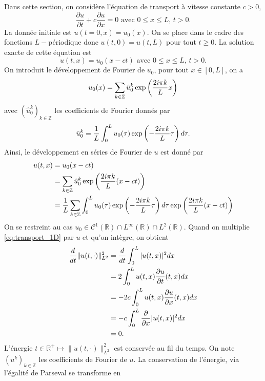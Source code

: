 Dans cette section, on considère l'équation de transport à vitesse constante $c>0$,
\begin{equation}
\dfrac{\partial u}{\partial t} + c \dfrac{\partial u}{\partial x} = 0 \text{ avec } 0 \leq x \leq L \text{, } t>0.
\label{eq:transport_1D}
\end{equation}
La donnée initiale est $u(t=0,x)=u_0(x)$. On se place dans le cadre des fonctions $L-$périodique donc $u(t,0)=u(t,L)$ pour tout $t \geq 0$. La solution exacte de cette équation est
\begin{equation}
u(t,x) = u_0(x-ct)  \text{ avec } 0 \leq x \leq L \text{, } t>0.
\end{equation}
On introduit le développement de Fourier de $u_0$, pour tout $x \in [0,L]$, on a
\begin{equation}
u_0(x) = \displaystyle\sum\limits_{k \in \mathbb{Z}} \hat{u}_0^k \exp \left( \dfrac{2i \pi k}{L} x \right)
\end{equation}
avec $(\hat{u}_0^k)_{k \in \mathbb{Z}}$ les coefficients de Fourier donnés par
\begin{equation}
\hat{u}_0^k = \dfrac{1}{L} \displaystyle\int_0^L u_0(\tau)  \exp \left( -\dfrac{2i \pi k}{L} \tau \right) d \tau.
\end{equation}
Ainsi, le développement en séries de Fourier de $u$ est donné par
\begin{align}
u(t,x) & = u_0(x-ct)\\
	& = \displaystyle\sum\limits_{k \in \mathbb{Z}} \hat{u}_0^k \exp \left( \dfrac{2i \pi k}{L} (x-ct) \right) \\
	& = \dfrac{1}{L} \displaystyle\sum\limits_{k \in \mathbb{Z}} \displaystyle\int_0^L u_0(\tau)  \exp \left( -\dfrac{2i \pi k}{L} \tau \right) d \tau \exp \left( \dfrac{2i \pi k}{L} (x-ct) \right)
	\label{eq:trsp_fourier}
\end{align}
On se restreint au cas $u_0 \in \mathcal{C}^1(\mathbb{R}) \cap L^{\infty}(\mathbb{R}) \cap L^2(\mathbb{R})$. Quand on multiplie \eqref{eq:transport_1D} par $u$ et qu'on intègre, on obtient
\begin{align*}
\dfrac{d}{dt} \| u (t,\cdot) \|_{L^2}^2 & = \dfrac{d}{dt} \displaystyle\int_0^L |u(t,x)|^2 dx \\
	& = 2 \displaystyle\int_0^L u(t,x) \dfrac{\partial u}{\partial t}(t,x) dx \\
	& = - 2 c \displaystyle\int_0^L u(t,x) \dfrac{\partial u}{\partial x}(t,x) dx \\
	& = - c \displaystyle\int_0^L \dfrac{\partial}{\partial x} |u(t,x)|^2 dx \\
	& = 0.
\end{align*}
L'énergie $t \in \mathbb{R}^+ \mapsto  \| u (t,\cdot) \|_{L^2}^2$ est conservée au fil du temps. On note $(u^k)_{k \in \mathbb{Z}}$ les coefficients de Fourier de $u$. La conservation de l'énergie, via l'égalité de Parseval se transforme en
